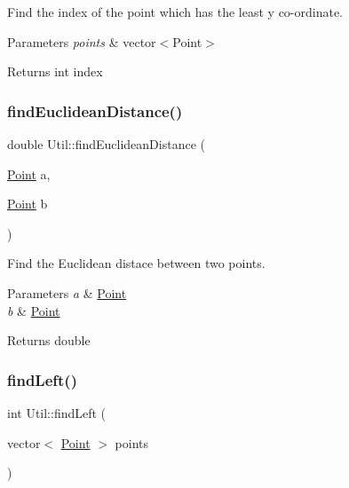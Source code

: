 Find the index of the point which has the least y co-\/ordinate. 


\begin{DoxyParams}{Parameters}
{\em points} & vector$<$\+Point$>$ \\
\hline
\end{DoxyParams}
\begin{DoxyReturn}{Returns}
int index 
\end{DoxyReturn}
\mbox{\label{classUtil_aee5381da3131d816c37c440fea97c84e}} 
\subsubsection{\texorpdfstring{find\+Euclidean\+Distance()}{findEuclideanDistance()}}
{\footnotesize\ttfamily double Util\+::find\+Euclidean\+Distance (\begin{DoxyParamCaption}\item[{\hyperlink{classPoint}{Point}}]{a,  }\item[{\hyperlink{classPoint}{Point}}]{b }\end{DoxyParamCaption})}



Find the Euclidean distace between two points. 


\begin{DoxyParams}{Parameters}
{\em a} & \hyperlink{classPoint}{Point} \\
\hline
{\em b} & \hyperlink{classPoint}{Point} \\
\hline
\end{DoxyParams}
\begin{DoxyReturn}{Returns}
double 
\end{DoxyReturn}
\mbox{\label{classUtil_a2b30e2030f853420c6fdc322b9c0baf0}} 
\subsubsection{\texorpdfstring{find\+Left()}{findLeft()}}
{\footnotesize\ttfamily int Util\+::find\+Left (\begin{DoxyParamCaption}\item[{vector$<$ \hyperlink{classPoint}{Point} $>$}]{points }\end{DoxyParamCaption})}



